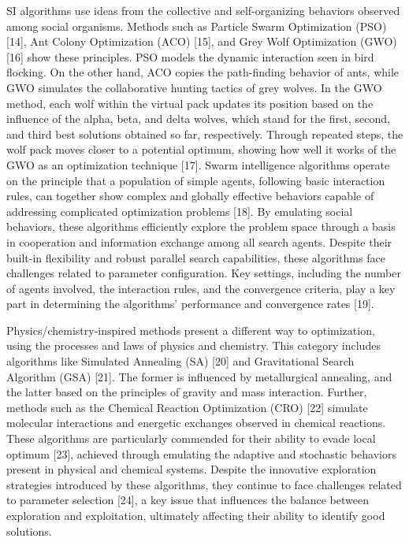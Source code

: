 \documentclass{article} %
\begin{document}
SI algorithms use ideas from the collective and self-organizing behaviors observed among social organisms. Methods such as Particle Swarm Optimization (PSO) [14], Ant Colony Optimization (ACO) [15], and Grey Wolf Optimization (GWO) [16] show these principles. PSO models the dynamic interaction seen in bird flocking. On the other hand, ACO copies the path-finding behavior of ants, while GWO simulates the collaborative hunting tactics of grey wolves. In the GWO method, each wolf within the virtual pack updates its position based on the influence of the alpha, beta, and delta wolves, which stand for the first, second, and third best solutions obtained so far, respectively. Through repeated steps, the wolf pack moves closer to a potential optimum, showing how well it works of the GWO as an optimization technique [17]. Swarm intelligence algorithms operate on the principle that a population of simple agents, following basic interaction rules, can together show complex and globally effective behaviors capable of addressing complicated optimization problems [18]. By emulating social behaviors, these algorithms efficiently explore the problem space through a basis in cooperation and information exchange among all search agents. Despite their built-in flexibility and robust parallel search capabilities, these algorithms face challenges related to parameter configuration. Key settings, including the number of agents involved, the interaction rules, and the convergence criteria, play a key part in determining the algorithms' performance and convergence rates [19].

Physics/chemistry-inspired methods present a different way to optimization, using the processes and laws of physics and chemistry. This category includes algorithms like Simulated Annealing (SA) [20] and Gravitational Search Algorithm (GSA) [21]. The former is influenced by metallurgical annealing, and the latter based on the principles of gravity and mass interaction. Further, methods such as the Chemical Reaction Optimization (CRO) [22] simulate molecular interactions and energetic exchanges observed in chemical reactions. These algorithms are particularly commended for their ability to evade local optimum [23], achieved through emulating the adaptive and stochastic behaviors present in physical and chemical systems. Despite the innovative exploration strategies introduced by these algorithms, they continue to face challenges related to parameter selection [24], a key issue that influences the balance between exploration and exploitation, ultimately affecting their ability to identify good solutions.
\end{document}
